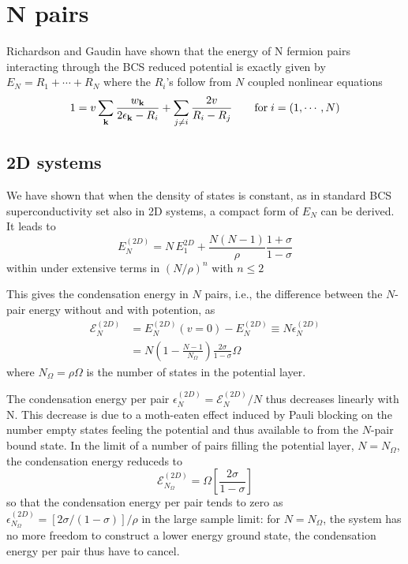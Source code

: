 \documentclass{article}
\newcommand{\td}{{\ensuremath{{(2D)}}}}
\begin{document}
\section{N pairs}
Richardson \cite{Richardson1} and Gaudin \cite{gaudin} have shown that the energy of N fermion pairs interacting through the BCS reduced potential is exactly given by $E_N=R_1+\cdots+R_N$ where the $R_i$'s follow from $N$ coupled nonlinear equations
\begin{equation}
 1=v\sum_{\mathbf{k}}\frac{w_{\mathbf{k}}}{2\epsilon_{\mathbf{k}}-R_i}+\sum_{j\neq{}i}\frac{2v}{R_i-R_j}\qquad\text{for}\;i=(1,\cdots,N)
\end{equation}
\subsection{2D systems}
We have shown that when the density of states is constant, as in standard BCS superconductivity set also in 2D systems, a compact form of $E_N$ can be derived. It leads to 
\begin{equation}
 E^(2D)_N=N\,E^{2D}_1+\frac{N(N-1)}{\rho}\frac{1+\sigma}{1-\sigma}
\end{equation}
within under extensive terms in $(N/\rho)^n$ with $n\leq2$

This gives the condensation energy in $N$ pairs, i.e., the difference between the $N$-pair energy without and with potention, as 
\begin{equation}\label{eq:E2D}
\begin{split}
 \mathcal{E}^{(2D)}_N&=E_N^{\td}(v=0)-E_N^\td\equiv{}N\epsilon_N^\td\\
&=N(1-\frac{N-1}{N_\Omega})\frac{2\sigma}{1-\sigma}\Omega
\end{split}
\end{equation}
where $N_\Omega=\rho\Omega$ is the number of states in the potential layer. 

The condensation energy per pair $\epsilon^\td_N=\mathcal{E}^\td_N/N$ thus decreases linearly with N. This decrease is due to a moth-eaten effect induced by Pauli blocking on the number empty states feeling the potential and thus available to from the $N$-pair bound state.  In the limit of a number of pairs filling the potential layer, $N=N_\Omega$, the condensation energy reduceds to 
\begin{equation}
 \mathcal{E}^\td_{N_\Omega}=\Omega[\frac{2\sigma}{1-\sigma}]
\end{equation}
so that the condensation energy per pair tends to zero as $\epsilon^\td_{N_\Omega}=[2\sigma/(1-\sigma)]/\rho$ in the large sample limit: for $N=N_\Omega$, the system has no more freedom to construct a lower energy ground state, the condensation energy per pair thus have to cancel.  
\end{document}
